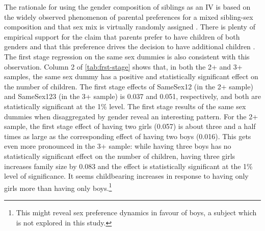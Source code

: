 The rationale for using the gender composition of siblings as an IV is based on the widely observed phenomenon of parental preferences for a mixed sibling-sex composition and that sex mix is virtually randomly assigned \parencite{angrist_children_1998}. There is plenty of empirical support for the claim that parents prefer to have children of both genders and that this preference drives the decision to have additional children \parencite[e.g.,][]{norling_measuring_2018,bisbee_local_2015}. The first stage regression on the same sex dummies is also consistent with this observation. Column 2 of \autoref{tab:frst-stage} shows that, in both the 2+ and 3+ samples, the same sex dummy has a positive and statistically significant effect on the number of children.  The first stage effects of SameSex12 (in the 2+ sample) and SameSex123 (in the 3+ sample) is 0.037 and 0.051, respectively, and both are statistically significant at the 1\% level. The first stage results of the same sex dummies when disaggregated by gender reveal an interesting pattern. For the 2+ sample, the first stage effect of having two girls (0.057) is about three and a half times as large as the corresponding effect of having two boys (0.016). This gets even more pronounced in the 3+ sample: while having three boys has no statistically significant effect on the number of children, having three girls increases family size by 0.083 and the effect is statistically significant at the 1\% level of significance. It seems childbearing increases in response to having only girls more than having only boys.\footnote{ This might reveal sex preference dynamics in favour of boys, a subject which is not explored in this study. } 


